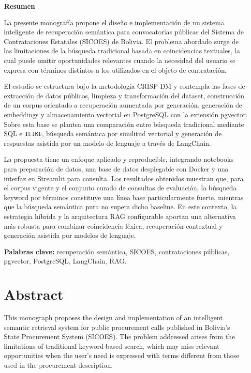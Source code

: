 \newpage
\begin{center}
  \textbf{Resumen}
\end{center}

\noindent
La presente monografía propone el diseño e implementación de un sistema inteligente de recuperación semántica para convocatorias públicas del Sistema de Contrataciones Estatales (SICOES) de Bolivia. El problema abordado surge de las limitaciones de la búsqueda tradicional basada en coincidencias textuales, la cual puede omitir oportunidades relevantes cuando la necesidad del usuario se expresa con términos distintos a los utilizados en el objeto de contratación.

El estudio se estructura bajo la metodología CRISP-DM y contempla las fases de extracción de datos públicos, limpieza y transformación del dataset, construcción de un corpus orientado a recuperación aumentada por generación, generación de embeddings y almacenamiento vectorial en PostgreSQL con la extensión pgvector. Sobre esta base se plantea una comparación entre búsqueda tradicional mediante SQL e \texttt{ILIKE}, búsqueda semántica por similitud vectorial y generación de respuestas asistida por un modelo de lenguaje a través de LangChain.

La propuesta tiene un enfoque aplicado y reproducible, integrando notebooks para preparación de datos, una base de datos desplegable con Docker y una interfaz en Streamlit para consulta. Los resultados obtenidos muestran que, para el corpus vigente y el conjunto curado de consultas de evaluación, la búsqueda keyword por términos constituye una línea base particularmente fuerte, mientras que la búsqueda semántica pura no supera dicho baseline. En este contexto, la estrategia híbrida y la arquitectura RAG configurable aportan una alternativa más robusta para combinar coincidencia léxica, recuperación contextual y generación asistida por modelos de lenguaje.

\bigskip
\noindent \textbf{Palabras clave:} recuperación semántica, SICOES, contrataciones públicas, pgvector, PostgreSQL, LangChain, RAG.

\newpage
\section*{Abstract}

\noindent
This monograph proposes the design and implementation of an intelligent semantic retrieval system for public procurement calls published in Bolivia's State Procurement System (SICOES). The problem addressed arises from the limitations of traditional keyword-based search, which may miss relevant opportunities when the user's need is expressed with terms different from those used in the procurement description.


